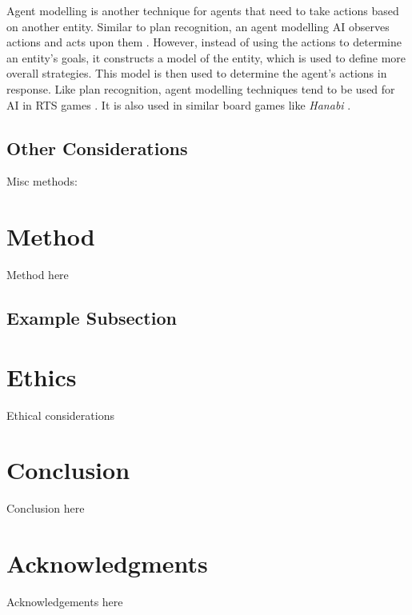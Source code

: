 \documentclass{IEEEtran}
\begin{document}
Agent modelling is another technique for agents that need to take actions based on another entity. Similar to plan recognition, an agent modelling AI observes actions and acts upon them \cite{yannakakis2013playermodelling}. However, instead of using the actions to determine an entity’s goals, it constructs a model of the entity, which is used to define more overall strategies. This model is then used to determine the agent's actions in response. Like plan recognition, agent modelling techniques tend to be used for AI in RTS games \cite{OpponentModellingRTS2007, bakkes2009opponentmodelling}. It is also used in similar board games like \textit{Hanabi} \cite{EvaluatingHanabiAgents}.

\subsection{Other Considerations}
\label{OtherConsiderations}

Misc methods: \cite{WaitASecond2019, SocialPerceptions2020, TheoryOfMind2013, von2017mindsofmany}
 
\section{Method}
\label{Method}

Method here

 \subsection{Example Subsection}
 
\section{Ethics}
\label{Ethics}

Ethical considerations
 
\section{Conclusion}
\label{Conc}
 
Conclusion here 
 
\section*{Acknowledgments}

Acknowledgements here


 
\end{document}
